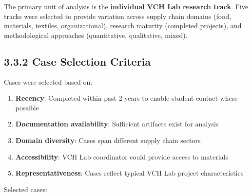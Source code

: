 \documentclass[
  oneside,
  open=any]{scrbook}
\providecommand{\tightlist}{%
  \setlength{\itemsep}{0pt}\setlength{\parskip}{0pt}}\usepackage{longtable,booktabs,array}
\begin{document}
The primary unit of analysis is the \textbf{individual VCH Lab research
track}. Five tracks were selected to provide variation across supply
chain domains (food, materials, textiles, organizational), research
maturity (completed projects), and methodological approaches
(quantitative, qualitative, mixed).

\subsection{3.3.2 Case Selection
Criteria}\label{case-selection-criteria}

Cases were selected based on:

\begin{enumerate}
\def\labelenumi{\arabic{enumi}.}
\tightlist
\item
  \textbf{Recency}: Completed within past 2 years to enable student
  contact where possible
\item
  \textbf{Documentation availability}: Sufficient artifacts exist for
  analysis
\item
  \textbf{Domain diversity}: Cases span different supply chain sectors
\item
  \textbf{Accessibility}: VCH Lab coordinator could provide access to
  materials
\item
  \textbf{Representativeness}: Cases reflect typical VCH Lab project
  characteristics
\end{enumerate}

Selected cases:
\end{document}
